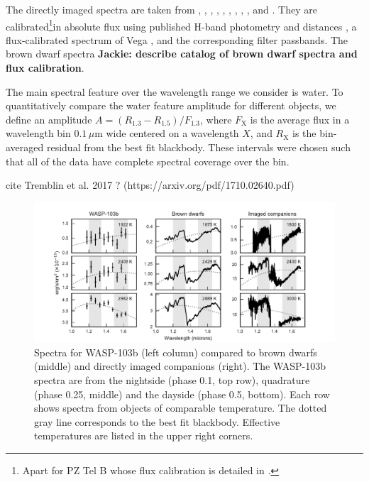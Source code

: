 \documentclass[twocolumn]{aastex61}
\begin{document}
The directly imaged spectra are taken from \cite{2008ApJ...689L.153L}, \cite{2010ApJ...719..497L}, \cite{2010A&A...512A..52B}, \cite{2011ApJ...729..139W} , \cite{2014A&A...562A.127B}, \cite{2011ApJ...730...42L}, \cite{2013ApJ...773...63A}, \cite{2016A&A...587A..56M}, \cite{2013ApJ...772...79A}, and \cite{2008ApJ...673L.185B}. They are calibrated\footnote{Apart for PZ Tel B whose flux calibration is detailed in \cite{2016A&A...587A..56M}.}in absolute flux using published H-band photometry \citep{2008ApJ...689L.153L, 2014A&A...562A.127B, 2011ApJ...729..139W, 2005A&A...430.1027C, 2011ApJ...730...42L, 2013ApJ...773...63A, 2003tmc..book.....C,2009A&A...506..799B} and distances \cite{2016A&A...595A...1G, 2007A&A...474..653V, 1999AJ....117..354D, 1999AJ....117.2381P}, a flux-calibrated spectrum of Vega \citep{1985A&A...151..399M, 1985IAUS..111..225H}, and the corresponding filter passbands.  The brown dwarf spectra \textbf{Jackie: describe catalog of brown dwarf spectra and flux calibration}.

The main spectral feature over the wavelength range we consider is water. To quantitatively compare the water feature amplitude for different objects, we define an amplitude $A = (R_\mathrm{1.3} - R_\mathrm{1.5})/F_\mathrm{1.3}$, where $F_\mathrm{X}$ is the average flux in a wavelength bin $0.1\,\mu$m wide centered on a wavelength $X$, and $R_\mathrm{X}$ is the bin-averaged residual from the best fit blackbody. These intervals were chosen such that all of the data have complete spectral coverage over the bin. 




cite Tremblin et al. 2017 ? (https://arxiv.org/pdf/1710.02640.pdf)

\begin{figure}
\includegraphics[width = 1.0\textwidth]{Figures/spectra_comparison.pdf}
\caption{Spectra for WASP-103b (left column) compared to brown dwarfs (middle) and directly imaged companions (right). The WASP-103b spectra are from the nightside (phase 0.1, top row), quadrature (phase 0.25, middle) and the dayside (phase 0.5, bottom). Each row shows spectra from objects of comparable temperature. The dotted gray line corresponds to the best fit blackbody. Effective temperatures are listed in the upper right corners.}
\label{fig:planetstarcomparison}
\end{figure}
\end{document}
